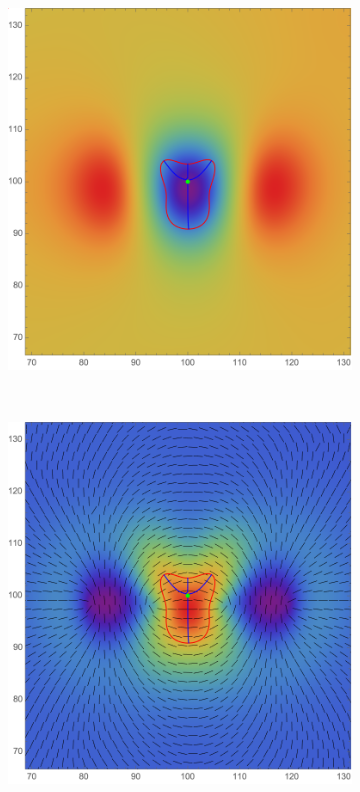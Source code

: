 \documentclass[a4paper, 11pt]{article}
\begin{document}
\begin{figure}
\centering
\begin{subfigure}[b]{0.32\textwidth}
\includegraphics[width=\textwidth]{Swallowtail_mean_Phi}
\end{subfigure}~
\begin{subfigure}[b]{0.32\textwidth}
\includegraphics[width=\textwidth]{Swallowtail_mean_L}

\end{subfigure}
\end{figure}
\end{document}
